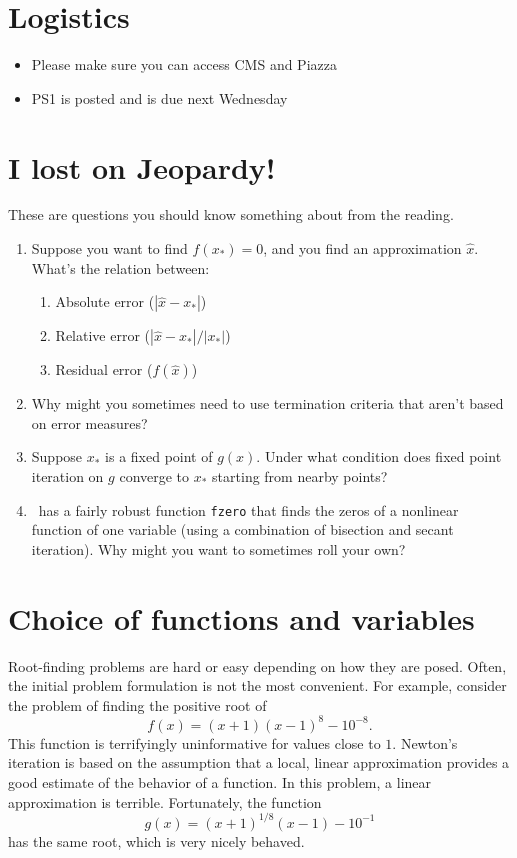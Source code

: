 \documentclass[12pt, leqno]{article}
\begin{document}

\section*{Logistics}

\begin{itemize}
\item Please make sure you can access CMS and Piazza
\item PS1 is posted and is due next Wednesday
\end{itemize}

\section*{I lost on Jeopardy!}

These are questions you should know something about from the reading.

\begin{enumerate}
\item
  Suppose you want to find $f(x_*) = 0$, and you find an approximation
  $\hat{x}$.  What's the relation between:
  \begin{enumerate}
  \item Absolute error ($|\hat{x}-x_*|$)
  \item Relative error ($|\hat{x}-x_*|/|x_*|$)
  \item Residual error ($f(\hat{x})$)
  \end{enumerate}
\item
  Why might you sometimes need to use termination criteria that aren't
  based on error measures?
\item
  Suppose $x_*$ is a fixed point of $g(x)$.  Under what condition does
  fixed point iteration on $g$ converge to $x_*$ starting from nearby
  points?
\item
  \matlab\ has a fairly robust function {\tt fzero} that finds the
  zeros of a nonlinear function of one variable (using a combination
  of bisection and secant iteration).  Why might you want to sometimes
  roll your own?
\end{enumerate}

\section*{Choice of functions and variables}

Root-finding problems are hard or easy depending on how they are
posed.  Often, the initial problem formulation is not the most
convenient.  For example, consider the problem of finding the positive
root of
\[
  f(x) = (x+1)(x-1)^8-10^{-8}.
\]
This function is terrifyingly uninformative for values close to $1$.
Newton's iteration is based on the assumption that a local, linear
approximation provides a good estimate of the behavior of a function.
In this problem, a linear approximation is terrible.  Fortunately, the
function
\[
  g(x) = (x+1)^{1/8} (x-1)-10^{-1}
\]
has the same root, which is very nicely behaved.
\end{document}

